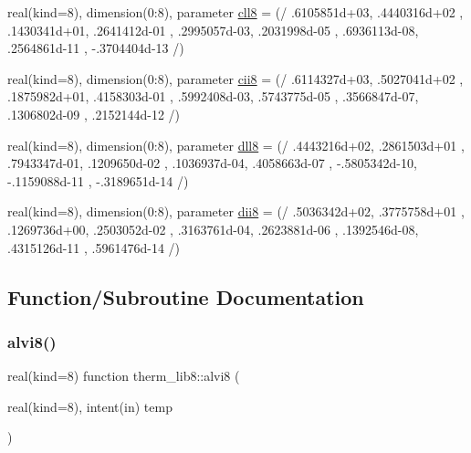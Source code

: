 \begin{DoxyCompactItemize}
real(kind=8), dimension(0\+:8), parameter \hyperlink{namespacetherm__lib8_a1f1e0a0dd53bbaf4515bc58ada29dba7}{cll8} = (/ .\+6105851d+03, .\+4440316d+02 , .\+1430341d+01, .\+2641412d-\/01 , .\+2995057d-\/03, .\+2031998d-\/05 , .\+6936113d-\/08, .\+2564861d-\/11 , -\/.\+3704404d-\/13 /)
\item 
real(kind=8), dimension(0\+:8), parameter \hyperlink{namespacetherm__lib8_aa9cd8b30beb20347cc9a45f40fd72baa}{cii8} = (/ .\+6114327d+03, .\+5027041d+02 , .\+1875982d+01, .\+4158303d-\/01 , .\+5992408d-\/03, .\+5743775d-\/05 , .\+3566847d-\/07, .\+1306802d-\/09 , .\+2152144d-\/12 /)
\item 
real(kind=8), dimension(0\+:8), parameter \hyperlink{namespacetherm__lib8_adbebbc1cdfb1af05d0cf1f50b2f0df90}{dll8} = (/ .\+4443216d+02, .\+2861503d+01 , .\+7943347d-\/01, .\+1209650d-\/02 , .\+1036937d-\/04, .\+4058663d-\/07 , -\/.\+5805342d-\/10, -\/.\+1159088d-\/11 , -\/.\+3189651d-\/14 /)
\item 
real(kind=8), dimension(0\+:8), parameter \hyperlink{namespacetherm__lib8_a3bfe64ca1b1761eb7fddc3aa544df182}{dii8} = (/ .\+5036342d+02, .\+3775758d+01 , .\+1269736d+00, .\+2503052d-\/02 , .\+3163761d-\/04, .\+2623881d-\/06 , .\+1392546d-\/08, .\+4315126d-\/11 , .\+5961476d-\/14 /)
\end{DoxyCompactItemize}


\subsection{Function/\+Subroutine Documentation}
\mbox{\label{namespacetherm__lib8_a3b1992f0fffee3a316b79819cac27382}} 
\subsubsection{\texorpdfstring{alvi8()}{alvi8()}}
{\footnotesize\ttfamily real(kind=8) function therm\+\_\+lib8\+::alvi8 (\begin{DoxyParamCaption}\item[{real(kind=8), intent(in)}]{temp }\end{DoxyParamCaption})}

